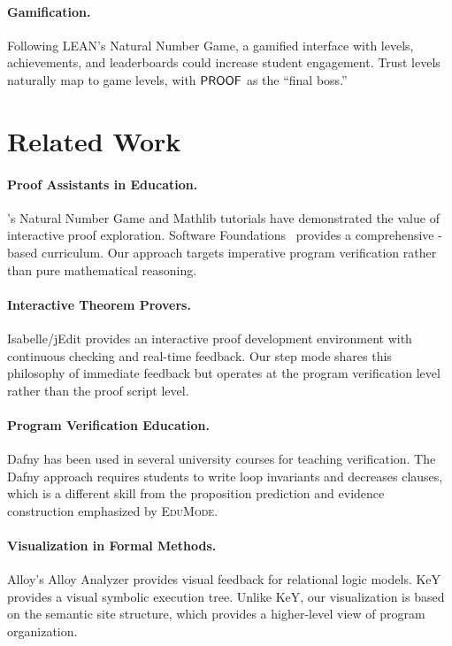 \documentclass[11pt]{article}
\newcommand{\EduMode}{\textsc{EduMode}}
\begin{document}
\paragraph{Gamification.}
Following LEAN's Natural Number Game, a gamified interface with levels,
achievements, and leaderboards could increase student engagement. Trust
levels naturally map to game levels, with $\mathsf{PROOF}$ as the ``final boss.''

\section{Related Work}\label{sec:related}

\paragraph{Proof Assistants in Education.}
\LEAN{}'s Natural Number Game and Mathlib tutorials have demonstrated the
value of interactive proof exploration. Software Foundations~\cite{pierce2019software}
provides a comprehensive \Coq{}-based curriculum. Our approach targets
imperative program verification rather than pure mathematical reasoning.

\paragraph{Interactive Theorem Provers.}
Isabelle/jEdit provides an interactive proof development environment with
continuous checking and real-time feedback. Our step mode shares this
philosophy of immediate feedback but operates at the program verification
level rather than the proof script level.

\paragraph{Program Verification Education.}
Dafny has been used in several university courses for teaching verification.
The Dafny approach requires students to write loop invariants and decreases
clauses, which is a different skill from the proposition prediction and
evidence construction emphasized by \EduMode{}.

\paragraph{Visualization in Formal Methods.}
Alloy's Alloy Analyzer provides visual feedback for relational logic models.
KeY~\cite{ahrendt2016key} provides a visual symbolic execution tree. Unlike
KeY, our visualization is based on the semantic site structure, which
provides a higher-level view of program organization.
\end{document}
